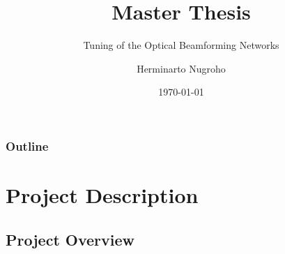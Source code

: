 \documentclass{beamer}
\title[OBFN]{Master Thesis}
\subtitle {Tuning of the Optical Beamforming Networks}
\institute[TU Delft]{Delft University of Technology}
\author{Herminarto Nugroho}
\date{\today}
\newcommand*\titleTOC{Outline}
\begin{document}
{
\frame{\titlepage}
}

{
\begin{frame}\frametitle{\titleTOC}
	\tableofcontents
\end{frame}
}

\section{Project Description}
\subsection{Project Overview}
\end{document}
